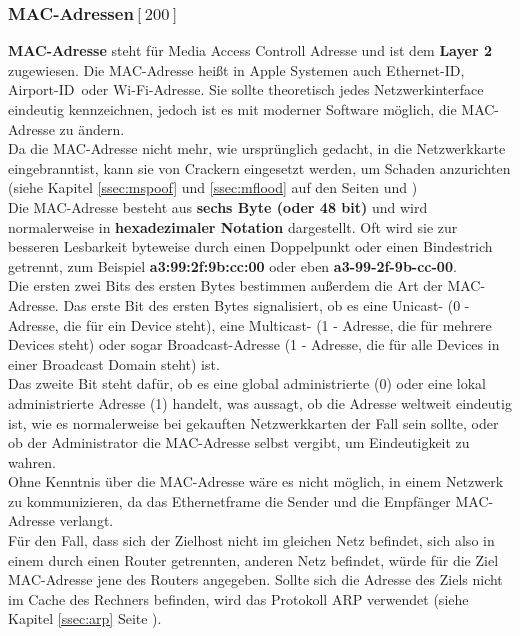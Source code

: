 \documentclass[12pt,a4paper]{report}
\begin{document}
\begin{onehalfspace}
\subsubsection{MAC-Adressen${[200]}$}\label{sssec:macaddr}
\textbf{MAC-Adresse} steht für Media Access Controll Adresse und ist dem \textbf{Layer 2} zugewiesen. Die MAC-Adresse heißt in Apple Systemen auch \glqq Ethernet-ID\grqq , \glqq Airport-ID\grqq \ oder \glqq Wi-Fi-Adresse\grqq . Sie sollte theoretisch jedes Netzwerkinterface eindeutig kennzeichnen, jedoch ist es mit moderner Software möglich, die MAC-Adresse zu ändern.\\
Da die MAC-Adresse nicht mehr, wie ursprünglich gedacht, in die Netzwerkkarte \glqq eingebrannt\grqq ist, kann sie von Crackern eingesetzt werden, um Schaden anzurichten (siehe Kapitel \ref{ssec:mspoof} und \ref{ssec:mflood} auf den Seiten \pageref{ssec:mspoof} und \pageref{ssec:mflood})\\

Die MAC-Adresse besteht aus \textbf{sechs Byte (oder 48 bit)} und wird normalerweise in \textbf{hexadezimaler Notation} dargestellt. Oft wird sie zur besseren Lesbarkeit byteweise durch einen Doppelpunkt oder einen Bindestrich getrennt, zum Beispiel \textbf{a3:99:2f:9b:cc:00} oder eben \textbf{a3-99-2f-9b-cc-00}.\\

Die ersten zwei Bits des ersten Bytes bestimmen außerdem die Art der MAC-Adresse. Das erste Bit des ersten Bytes signalisiert, ob es eine Unicast- (0 - Adresse, die für ein Device steht), eine Multicast-   (1 - Adresse, die für mehrere Devices steht) oder sogar Broadcast-Adresse (1 - Adresse, die für alle Devices in einer Broadcast Domain steht) ist.\\
Das zweite Bit steht dafür, ob es eine global administrierte (0) oder eine lokal administrierte Adresse (1) handelt, was aussagt, ob die Adresse weltweit eindeutig ist, wie es normalerweise bei gekauften Netzwerkkarten der Fall sein sollte, oder ob der Administrator die MAC-Adresse selbst vergibt, um Eindeutigkeit zu wahren.\\

Ohne Kenntnis über die MAC-Adresse wäre es nicht möglich, in einem Netzwerk zu kommunizieren, da das Ethernetframe die Sender und die Empfänger MAC-Adresse verlangt.\\
Für den Fall, dass sich der Zielhost nicht im gleichen Netz befindet, sich also in einem durch einen Router getrennten, anderen Netz befindet, würde für die Ziel MAC-Adresse jene des Routers angegeben. Sollte sich die Adresse des Ziels nicht im Cache des Rechners befinden, wird das Protokoll ARP verwendet (siehe Kapitel \ref{ssec:arp} Seite \pageref{ssec:arp}). 

\end{onehalfspace}
\end{document}

